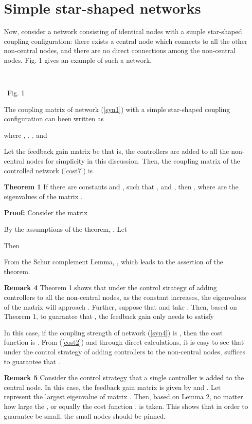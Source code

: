 \documentclass[11pt]{article}
\def\dref#1{(\ref{#1})}
\begin{document}
\section{Simple star-shaped networks}

\quad Now, consider a network consisting of  identical nodes with
a simple star-shaped coupling configuration: there exists a central
node which connects to all the other non-central nodes, and there
are no direct connections among the non-central nodes. Fig. 1 gives
an example of such a network.
\begin{center}
\quad\unitlength=1cm \hbox{\hspace*{0.1cm} 
 }
\end{center}
\vskip-0.6cm
\qquad\qquad\qquad\qquad\qquad\qquad\qquad\qquad\qquad\quad\, Fig.
1\,\,\,\, 

The coupling matrix  of network \dref{syn1} with a simple
star-shaped coupling configuration can been written as

where , ,
, and 

Let the feedback gain matrix be  that
is, the controllers are added to all the non-central nodes for
simplicity in this discussion. Then, the coupling matrix of the
controlled network \dref{cost7} is


\textbf {Theorem 1} If there are constants  and
, such that ,
 and
, then
, where
 are the eigenvalues of the
matrix .

{\bf Proof:} Consider the matrix

By the assumptions of the theorem, .
Let

Then

From the Schur complement Lemma, , which leads
to the assertion of the theorem. \hfill 

\textbf {Remark 4} Theorem 1 shows that under the control strategy
of adding controllers to all the non-central nodes, as the constant
 increases, the eigenvalues of the matrix 
will approach . Further, suppose that  and take
. Then, based on Theorem 1, to guarantee that
, the feedback
 gain  only needs to satisfy

In this case, if the coupling strength of network \dref{syn4} is
, then the cost function is . From
\dref{cost2} and through direct calculations, it is easy to see that
under the control strategy of adding controllers to the non-central
nodes,  suffices to guarantee that
.

\textbf {Remark 5} Consider the control strategy that a single
controller is added to the central node. In this case, the feedback
gain matrix is given by  and . Let 
represent the largest eigenvalue of matrix . Then, based
on Lemma 2,  no matter how large the
, or equally the cost function , is taken. This
shows that in order to guarantee  be small, the small
nodes should be pinned.
\end{document}
